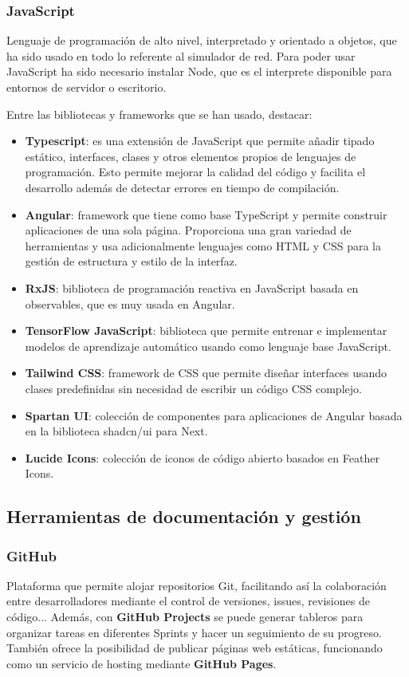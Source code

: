 \subsubsection{JavaScript}
\label{subsubsec:javascript}
Lenguaje de programación de alto nivel, interpretado y orientado a objetos, que ha sido usado en todo lo referente al simulador de red. Para poder usar JavaScript ha sido necesario instalar Node, que es el interprete disponible para entornos de servidor o escritorio.

Entre las bibliotecas y frameworks que se han usado, destacar:
\begin{itemize}
    \item \textbf{Typescript}: es una extensión de JavaScript que permite añadir tipado estático, interfaces, clases y otros elementos propios de lenguajes de programación. Esto permite mejorar la calidad del código y facilita el desarrollo además de detectar errores en tiempo de compilación.
    \item \textbf{Angular}: framework que tiene como base TypeScript y permite construir aplicaciones de una sola página. Proporciona una gran variedad de herramientas y usa adicionalmente lenguajes como HTML y CSS para la gestión de estructura y estilo de la interfaz.
    \item \textbf{RxJS}: biblioteca de programación reactiva en JavaScript basada en observables, que es muy usada en Angular. 
    \item \textbf{TensorFlow JavaScript}: biblioteca que permite entrenar e implementar modelos de aprendizaje automático usando como lenguaje base JavaScript.
    \item \textbf{Tailwind CSS}: framework de CSS que permite diseñar interfaces usando clases predefinidas sin necesidad de escribir un código CSS complejo.
    \item \textbf{Spartan UI}: colección de componentes para aplicaciones de Angular basada en la biblioteca shadcn/ui para Next.
    \item \textbf{Lucide Icons}: colección de iconos de código abierto basados en Feather Icons.
\end{itemize}

\subsection{Herramientas de documentación y gestión}
\label{subsec:gestion}
\subsubsection{GitHub}
\label{subsubsec:github}
Plataforma que permite alojar repositorios Git, facilitando así la colaboración entre desarrolladores mediante el control de versiones, issues, revisiones de código... Además, con \textbf{GitHub Projects} se puede generar tableros para organizar tareas en diferentes Sprints y hacer un seguimiento de su progreso. También ofrece la posibilidad de publicar páginas web estáticas, funcionando como un servicio de hosting mediante \textbf{GitHub Pages}.

